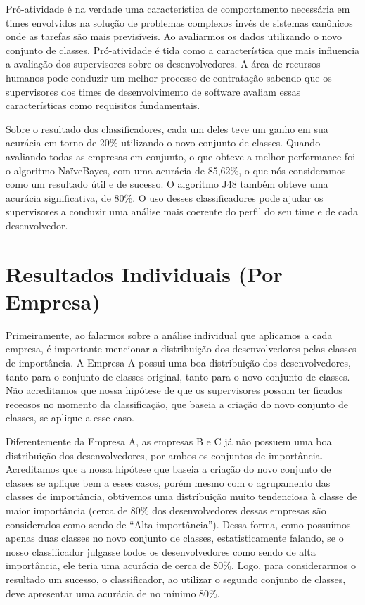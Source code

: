 Pró-atividade é na verdade uma característica de comportamento necessária em times envolvidos na solução de problemas complexos invés de sistemas canônicos onde as tarefas são mais previsíveis. Ao avaliarmos os dados utilizando o novo conjunto de classes, Pró-atividade é tida como a característica que mais influencia a avaliação dos supervisores sobre os desenvolvedores. A área de recursos humanos pode conduzir um melhor processo de contratação sabendo que os supervisores dos times de desenvolvimento de software avaliam essas características como requisitos fundamentais.

Sobre o resultado dos classificadores, cada um deles teve um ganho em sua acurácia em torno de 20\% utilizando o novo conjunto de classes. Quando avaliando todas as empresas em conjunto, o que obteve a melhor performance foi o algoritmo NaïveBayes, com uma acurácia de 85,62\%, o que nós consideramos como um resultado útil e de sucesso. O algoritmo J48 também obteve uma acurácia significativa, de 80\%. O uso desses classificadores pode ajudar os supervisores a conduzir uma análise mais coerente do perfil do seu time e de cada desenvolvedor.

\section{Resultados Individuais (Por Empresa)}
Primeiramente, ao falarmos sobre a análise individual que aplicamos a cada empresa, é importante mencionar a distribuição dos desenvolvedores pelas classes de importância. A Empresa A possui uma boa distribuição dos desenvolvedores, tanto para o conjunto de classes original, tanto para o novo conjunto de classes. Não acreditamos que nossa hipótese de que os supervisores possam ter ficados receosos no momento da classificação, que baseia a criação do novo conjunto de classes, se aplique a esse caso.

Diferentemente da Empresa A, as empresas B e C já não possuem uma boa distribuição dos desenvolvedores, por ambos os conjuntos de importância. Acreditamos que a nossa hipótese que baseia a criação do novo conjunto de classes se aplique bem a esses casos, porém mesmo com o agrupamento das classes de importância, obtivemos uma distribuição muito tendenciosa à classe de maior importância (cerca de 80\% dos desenvolvedores dessas empresas são considerados como sendo de “Alta importância”). Dessa forma, como possuímos apenas duas classes no novo conjunto de classes, estatisticamente falando, se o nosso classificador julgasse todos os desenvolvedores como sendo de alta importância, ele teria uma acurácia de cerca de 80\%. Logo, para considerarmos o resultado um sucesso, o classificador, ao utilizar o segundo conjunto de classes, deve apresentar uma acurácia de no mínimo 80\%.

